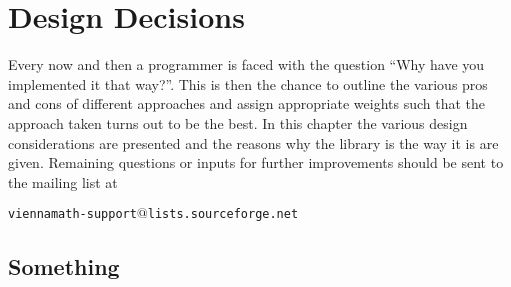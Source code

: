 \chapter{Design Decisions} \label{chap:design}

Every now and then a programmer is faced with the question ``Why have you implemented it that way?''.
This is then the chance to outline the various pros and cons of different approaches and assign appropriate weights such that the approach taken turns out to be the best.
In this chapter the various design considerations are presented and the reasons why the library is the way it is are given.
Remaining questions or inputs for further improvements should be sent to the mailing list at
\begin{center}
\texttt{viennamath-support$@$lists.sourceforge.net} 
\end{center}

\section{Something}